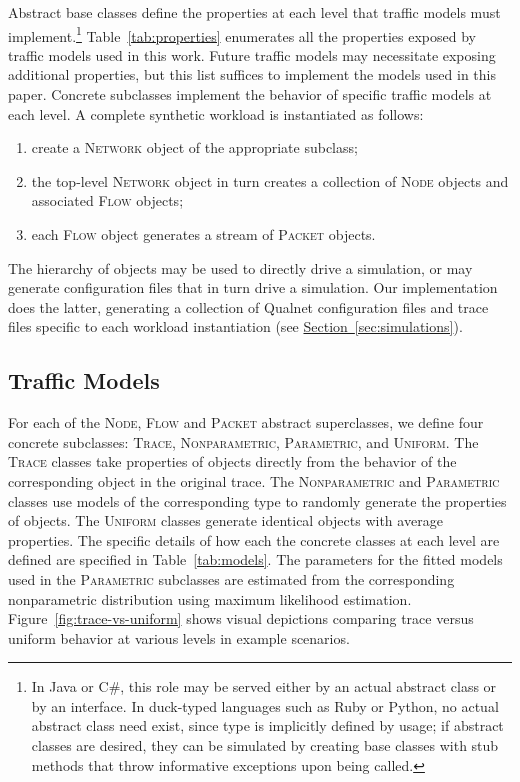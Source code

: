 \documentclass[conference]{IEEEtran}
\newcommand{\Section}[1]{\hyperref[sec:#1]{Section~\ref*{sec:#1}}}
\newcommand{\class}[1]{\textsc{\small{#1}}}
\begin{document}
Abstract base classes define the properties at each level that traffic models must implement.\footnote{In Java or C\#, this role may be served either by an actual abstract class or by an interface. In duck-typed languages such as Ruby or Python, no actual abstract class need exist, since type is implicitly defined by usage; if abstract classes are desired, they can be simulated by creating base classes with stub methods that throw informative exceptions upon being called.} 
Table~\ref{tab:properties} enumerates all the properties exposed by traffic models used in this work. Future traffic models may necessitate exposing additional properties, but this list suffices to implement the models used in this paper. Concrete subclasses implement the behavior of specific traffic models at each level. A complete synthetic workload is instantiated as follows:
\begin{enumerate}
\item create a \class{Network} object of the appropriate subclass;
\item the top-level \class{Network} object in turn creates a collection of \class{Node} objects and associated \class{Flow} objects;
\item each \class{Flow} object generates a stream of \class{Packet} objects.
\end{enumerate}
The hierarchy of objects may be used to directly drive a simulation, or may generate configuration files that in turn drive a simulation. Our implementation does the latter, generating a collection of Qualnet configuration files and trace files specific to each workload instantiation (see \Section{simulations}).

\subsection{Traffic Models}\label{sec:models}

For each of the \class{Node}, \class{Flow} and \class{Packet} abstract superclasses, we define four concrete subclasses: \class{Trace}, \class{Nonparametric}, \class{Parametric}, and \class{Uniform}. The \class{Trace} classes take properties of objects directly from the behavior of the corresponding object in the original trace. The \class{Nonparametric} and \class{Parametric} classes use models of the corresponding type to randomly generate the properties of objects. The \class{Uniform} classes generate identical objects with average properties. The specific details of how each the concrete classes at each level are defined are specified in Table~\ref{tab:models}. The parameters for the fitted models used in the \class{Parametric} subclasses are estimated from the corresponding nonparametric distribution using maximum likelihood estimation. Figure~\ref{fig:trace-vs-uniform} shows visual depictions comparing trace versus uniform behavior at various levels in example scenarios.
\end{document}
